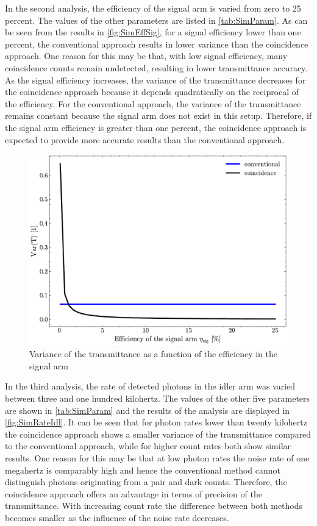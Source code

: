 In the second analysis, the efficiency of the signal arm is varied from zero to 25 percent. The values of the other parameters are listed in \autoref{tab:SimParam}. As can be seen from the results in \autoref{fig:SimEffSig}, for a signal efficiency lower than one percent, the conventional approach results in lower variance than the coincidence approach. One reason for this may be that, with low signal efficiency, many coincidence counts remain undetected, resulting in lower transmittance accuracy. As the signal efficiency increases, the variance of the transmittance decreases for the coincidence approach because it depends quadratically on the reciprocal of the efficiency. For the conventional approach, the variance of the transmittance remains constant because the signal arm does not exist in this setup. Therefore, if the signal arm efficiency is greater than one percent, the coincidence approach is expected to provide more accurate results than the conventional approach.
\begin{figure}[tb!]
	\centering
	\includegraphics[width=.7\textwidth]{Images/SimulationSweepEffSig.pdf}
	\caption{Variance of the transmittance as a function of the efficiency in the signal arm}
	\label{fig:SimEffSig}
\end{figure}\newline
In the third analysis, the rate of detected photons in the idler arm was varied between three and one hundred kilohertz. The values of the other five parameters are shown in \autoref{tab:SimParam} and the results of the analysis are displayed in \autoref{fig:SimRateIdl}. It can be seen that for photon rates lower than twenty kilohertz the coincidence approach shows a smaller variance of the transmittance compared to the conventional approach, while for higher count rates both show similar results. One reason for this may be that at low photon rates the noise rate of one megahertz is comparably high and hence the conventional method cannot distinguish photons originating from a pair and dark counts. Therefore, the coincidence approach offers an advantage in terms of precision of the transmittance. With increasing count rate the difference between both methods becomes smaller as the influence of the noise rate decreases. 
